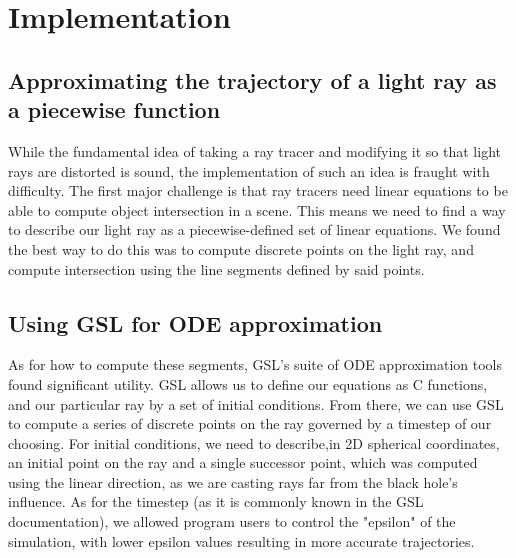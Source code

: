 
\section{Implementation}
\label{sec:impl}


\subsection {Approximating the trajectory of a light ray as a piecewise function}
While the fundamental idea of taking a ray tracer and modifying it so that light rays are distorted is sound, the implementation of such an idea is fraught with difficulty. The first major challenge is that ray tracers need linear equations to be able to compute object intersection in a scene. This means we need to find a way to describe our light ray as a piecewise-defined set of linear equations. We found the best way to do this was to compute discrete points on the light ray, and compute intersection using the line segments defined by said points. 


\subsection {Using GSL for ODE approximation}
As for how to compute these segments, GSL's suite  of ODE approximation tools found significant utility. GSL allows us to define our equations as C functions, and our particular ray by a set of initial conditions. From there, we can use GSL to compute a series of discrete points on the ray governed by a timestep of our choosing. For initial conditions, we need to describe,in 2D spherical coordinates, an initial point on the ray and a single successor point, which was computed using the linear direction, as we are casting rays far from the black hole's influence. As for the timestep (as it is commonly known in the GSL documentation), we allowed program users to control the "epsilon"  of the simulation, with lower epsilon values resulting in more accurate trajectories. 


